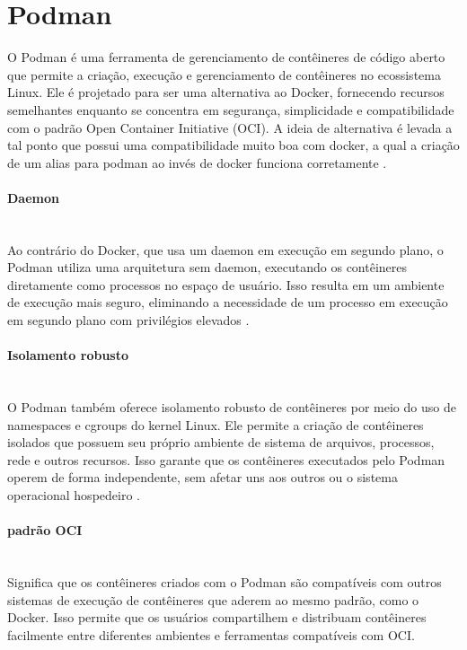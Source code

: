 \section{Podman}
O Podman é uma ferramenta de gerenciamento de contêineres de código aberto que permite a criação, execução e gerenciamento de contêineres no ecossistema Linux. Ele é projetado para ser uma alternativa ao Docker, fornecendo recursos semelhantes enquanto se concentra em segurança, simplicidade e compatibilidade com o padrão Open Container Initiative (OCI). A ideia de alternativa é levada a tal ponto que possui uma compatibilidade muito boa com docker, a qual a criação de um alias para podman ao invés de docker funciona corretamente \cite{podman-docs, what-is-podman}.

\paragraph*{Daemon}\mbox{}\\
Ao contrário do Docker, que usa um daemon em execução em segundo plano, o Podman utiliza uma arquitetura sem daemon, executando os contêineres diretamente como processos no espaço de usuário. Isso resulta em um ambiente de execução mais seguro, eliminando a necessidade de um processo em execução em segundo plano com privilégios elevados \cite{podman-docs,what-is-podman}.

\paragraph*{Isolamento robusto}\mbox{}\\
O Podman também oferece isolamento robusto de contêineres por meio do uso de namespaces e cgroups do kernel Linux. Ele permite a criação de contêineres isolados que possuem seu próprio ambiente de sistema de arquivos, processos, rede e outros recursos. Isso garante que os contêineres executados pelo Podman operem de forma independente, sem afetar uns aos outros ou o sistema operacional hospedeiro \cite{what-is-podman}.


\paragraph*{padrão OCI}\mbox{}\\
Significa que os contêineres criados com o Podman são compatíveis com outros sistemas de execução de contêineres que aderem ao mesmo padrão, como o Docker. Isso permite que os usuários compartilhem e distribuam contêineres facilmente entre diferentes ambientes e ferramentas compatíveis com OCI.

